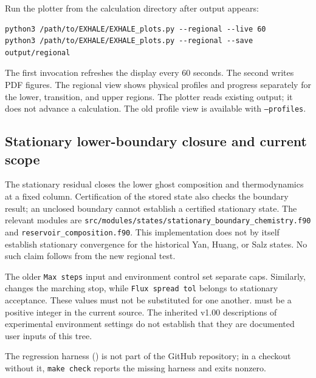 Run the plotter from the calculation directory after output appears:

\begin{lstlisting}[style=sh]
python3 /path/to/EXHALE/EXHALE_plots.py --regional --live 60
python3 /path/to/EXHALE/EXHALE_plots.py --regional --save output/regional
\end{lstlisting}

The first invocation refreshes the display every 60 seconds. The second
writes PDF figures. The regional view shows physical profiles and progress
separately for the lower, transition, and upper regions. The plotter reads
existing output; it does not advance a calculation. The old profile view is
available with \texttt{--profiles}.

\subsection{Stationary lower-boundary closure and current scope}

The stationary residual closes the lower ghost composition and
thermodynamics at a fixed column. Certification of the stored state also
checks the boundary result; an unclosed boundary cannot establish a certified
stationary state. The relevant modules are
\texttt{src/modules/states/stationary\_boundary\_chemistry.f90} and
\texttt{reservoir\_composition.f90}. This implementation does not by itself
establish stationary convergence for the historical Yan, Huang, or Salz
states. No such claim follows from the new regional test.

The older \texttt{Max steps} input and 
environment control set separate caps. Similarly,
 changes the marching stop, while
\texttt{Flux spread tol} belongs to stationary acceptance. These values must
not be substituted for one another.  must be a
positive integer in the current source. The inherited v1.00 descriptions of
experimental environment settings do not establish that they are documented
user inputs of this tree.

The regression harness () is not part of the
GitHub repository; in a checkout without it, \texttt{make check} reports
the missing harness and exits nonzero.

